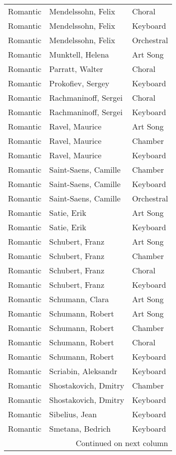 \begin{table}[!htbp]
\begin{tabular}{@{}lll@{}}
        Romantic & Mendelssohn, Felix & Choral \\
        Romantic & Mendelssohn, Felix & Keyboard \\
        Romantic & Mendelssohn, Felix & Orchestral \\
        Romantic & Munktell, Helena & Art Song \\
        Romantic & Parratt, Walter & Choral \\
        Romantic & Prokofiev, Sergey & Keyboard \\
        Romantic & Rachmaninoff, Sergei & Choral \\
        Romantic & Rachmaninoff, Sergei & Keyboard \\
        Romantic & Ravel, Maurice & Art Song \\
        Romantic & Ravel, Maurice & Chamber \\
        Romantic & Ravel, Maurice & Keyboard \\
        Romantic & Saint-Saens, Camille & Chamber \\
        Romantic & Saint-Saens, Camille & Keyboard \\
        Romantic & Saint-Saens, Camille & Orchestral \\
        Romantic & Satie, Erik & Art Song \\
        Romantic & Satie, Erik & Keyboard \\
        Romantic & Schubert, Franz & Art Song \\
        Romantic & Schubert, Franz & Chamber \\
        Romantic & Schubert, Franz & Choral \\
        Romantic & Schubert, Franz & Keyboard \\
        Romantic & Schumann, Clara & Art Song \\
        Romantic & Schumann, Robert & Art Song \\
        Romantic & Schumann, Robert & Chamber \\
        Romantic & Schumann, Robert & Choral \\
        Romantic & Schumann, Robert & Keyboard \\
        Romantic & Scriabin, Aleksandr & Keyboard \\
        Romantic & Shostakovich, Dmitry & Chamber \\
        Romantic & Shostakovich, Dmitry & Keyboard \\
        Romantic & Sibelius, Jean & Keyboard \\
        Romantic & Smetana, Bedrich & Keyboard \\
        \bottomrule
        \multicolumn{3}{r}{Continued on next column}
    \end{tabular}
\end{table}


